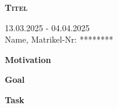 \documentclass[a4paper, 10pt]{article}
\begin{document}
	
	\begin{center}
		\fontsize{24pt}{10pt}\selectfont
		\textsc{\textbf{Titel}}
	\end{center}
	\begin{center}
		13.03.2025 - 04.04.2025 \\
		Name, Matrikel-Nr: ********
	\end{center}
	\begin{flushleft}
		\textbf{Motivation}
	\end{flushleft}
	
	\begin{flushleft}
		\textbf{Goal}
	\end{flushleft}
	\begin{flushleft}
		\textbf{Task}
	\end{flushleft}
	\newpage
	\printbibliography
\end{document}
